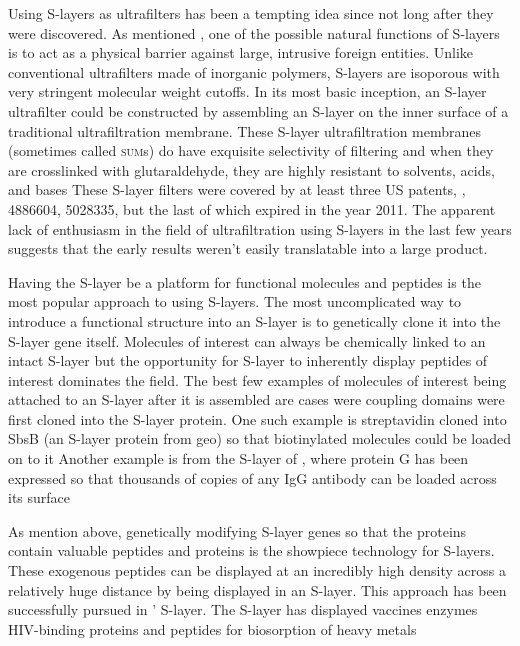   Using \acp{S-layer} as ultrafilters has been a tempting idea since not long after they were discovered. As mentioned , one of the possible natural functions of \acp{S-layer} is to act as a physical barrier against large, intrusive foreign entities. Unlike conventional ultrafilters made of inorganic polymers, \acp{S-layer} are isoporous with very stringent molecular weight cutoffs. In its most basic inception, an \ac{S-layer} ultrafilter could be constructed by assembling an \ac{S-layer} on the inner surface of a traditional ultrafiltration membrane. These \ac{S-layer} ultrafiltration membranes (sometimes called \textsc{sum}s) do have exquisite selectivity of filtering and when they are crosslinked with glutaraldehyde, they are highly resistant to solvents, acids, and bases These \ac{S-layer} filters were covered by at least three US patents, , 4886604, 5028335, but the last of which expired in the year 2011. The apparent lack of enthusiasm in the field of ultrafiltration using \acp{S-layer} in the last few years suggests that the early results weren't easily translatable into a large product.
  
  Having the \ac{S-layer} be a platform for functional molecules and peptides is the most popular approach to using \acp{S-layer}. The most uncomplicated way to introduce a functional structure into an \ac{S-layer} is to genetically clone it into the \ac{S-layer} gene itself. Molecules of interest can always be chemically linked to an intact \ac{S-layer} but the opportunity for \ac{S-layer} to inherently display peptides of interest dominates the field. The best few examples of molecules of interest being attached to an \ac{S-layer} after it is assembled are cases were coupling domains were first cloned into the \ac{S-layer} protein. One such example is streptavidin cloned into SbsB (an \ac{S-layer} protein from \ac{geo}) so that biotinylated molecules could be loaded on to it Another example is from the \ac{S-layer} of \caulobacter{}, where protein G has been expressed so that thousands of copies of any IgG antibody can be loaded across its surface

  As mention above, genetically modifying \ac{S-layer} genes so that the proteins contain valuable peptides and proteins is the showpiece technology for \acp{S-layer}. These exogenous peptides can be displayed at an incredibly high density across a relatively huge distance by being displayed in an \ac{S-layer}. This approach has been successfully pursued in \caulobacter{}' \ac{S-layer}. The \caulobacter{} \ac{S-layer} has displayed vaccines enzymes HIV-binding proteins and peptides for biosorption of heavy metals 

